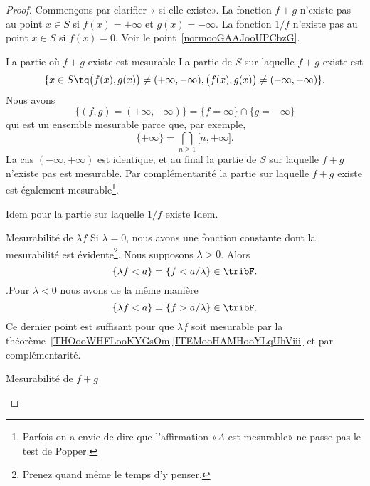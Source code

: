 \begin{proof}
    Commençons par clarifier « si elle existe». La fonction \( f+g\) n'existe pas au point \( x\in S\) si \( f(x)=+\infty\) et \( g(x)=-\infty\). La fonction \( 1/f\) n'existe pas au point \( x\in S\) si \( f(x)=0\). Voir le point~\ref{normooGAAJooUPCbzG}.
    \begin{subproof}
    \item[La partie où \( f+g\) existe est mesurable]
        La partie de \( S\) sur laquelle \( f+g\) existe est
        \begin{equation}
            \{ x\in S\tq \big( f(x),g(x) \big)\neq (+\infty,-\infty),\big( f(x),g(x) \big)\neq (-\infty,+\infty) \}.
        \end{equation}
        Nous avons
        \begin{equation}
            \{  (f,g)=(+\infty,-\infty) \}=\{ f=\infty \}\cap\{ g=-\infty \}
        \end{equation}
        qui est un ensemble mesurable parce que, par exemple,
        \begin{equation}
            \{ +\infty \}=\bigcap_{n\geq 1}\mathopen[ n , +\infty \mathclose].
        \end{equation}
        La cas \( (-\infty,+\infty)\) est identique, et au final la partie de \( S\) sur laquelle \( f+g\) n'existe pas est mesurable. Par complémentarité la partie sur laquelle \( f+g\) existe est également mesurable\footnote{Parfois on a envie de dire que l'affirmation «\( A\) est mesurable» ne passe pas le test de Popper.}.
    \item[Idem pour la partie sur laquelle \( 1/f\) existe]
        Idem.
    \item[Mesurabilité de \( \lambda f\)]
        Si \( \lambda=0\), nous avons une fonction constante dont la mesurabilité est évidente\footnote{Prenez quand même le temps d'y penser.}. Nous supposons \( \lambda>0\). Alors
        \begin{equation}
            \{ \lambda f<a \}=\{ f<a/\lambda \}\in \tribF.
        \end{equation}
        .Pour \( \lambda<0\) nous avons de la même manière
        \begin{equation}
            \{ \lambda f<a \}=\{ f>a/\lambda \}\in \tribF.
        \end{equation}
        Ce dernier point est suffisant pour que \( \lambda f\) soit mesurable par la théorème~\ref{THOooWHFLooKYGsOm}\ref{ITEMooHAMHooYLqUhViii} et par complémentarité.
    \item[Mesurabilité de \( f+g\)]

\end{subproof}
\end{proof}
